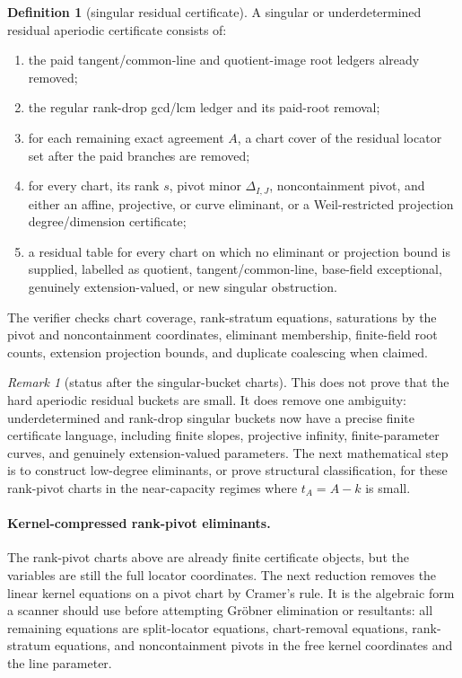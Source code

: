 \documentclass[11pt]{article}
\theoremstyle{definition}
\newtheorem{definition}[definition]{Definition}
\theoremstyle{remark}
\newtheorem{remark}[remark]{Remark}
\begin{document}
\begin{definition}[singular residual certificate]
\label{def:singular-residual-certificate}
A singular or underdetermined residual aperiodic certificate consists of:
\begin{enumerate}[label=\textup{(\roman*)},leftmargin=2.2em]
\item the paid tangent/common-line and quotient-image root ledgers already
removed;
\item the regular rank-drop gcd/lcm ledger and its paid-root removal;
\item for each remaining exact agreement $A$, a chart cover of the residual
locator set after the paid branches are removed;
\item for every chart, its rank $s$, pivot minor $\Delta_{I,J}$, noncontainment
pivot, and either an affine, projective, or curve eliminant, or a
Weil-restricted projection degree/dimension certificate;
\item a residual table for every chart on which no eliminant or projection bound
is supplied, labelled as quotient, tangent/common-line, base-field exceptional,
genuinely extension-valued, or new singular obstruction.
\end{enumerate}
The verifier checks chart coverage, rank-stratum equations, saturations by the
pivot and noncontainment coordinates, eliminant membership, finite-field root
counts, extension projection bounds, and duplicate coalescing when claimed.
\end{definition}

\begin{remark}[status after the singular-bucket charts]
\label{rem:singular-bucket-chart-status}
This does not prove that the hard aperiodic residual buckets are small.  It does remove
one ambiguity: underdetermined and rank-drop singular buckets now have a precise
finite certificate language, including finite slopes, projective infinity,
finite-parameter curves, and genuinely extension-valued parameters.  The next
mathematical step is to construct low-degree eliminants, or prove structural
classification, for these rank-pivot charts in the near-capacity regimes where
$t_A=A-k$ is small.
\end{remark}


\paragraph{Kernel-compressed rank-pivot eliminants.}
The rank-pivot charts above are already finite certificate objects, but the
variables are still the full locator coordinates.  The next reduction removes the
linear kernel equations on a pivot chart by Cramer's rule.  It is the algebraic
form a scanner should use before attempting Gr\"obner elimination or resultants:
all remaining equations are split-locator equations, chart-removal equations,
rank-stratum equations, and noncontainment pivots in the free kernel coordinates
and the line parameter.
\end{document}

